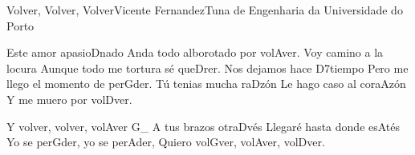 \begin{musica}{Volver, Volver, Volver}{Vicente Fernandez}{Tuna de Engenharia da Universidade do Porto}

Este amor apasio\ac{D}{na}do
Anda todo alborotado por vol\ac{A}{ver}.
Voy camino a la locura
Aunque todo me tortura sé que\ac{D}{rer}.
Nos dejamos hace \ac{D7}{tiem}po
Pero me llego el momento de per\ac{G}{der}.
Tú tenias mucha ra\ac{D}{zón}
Le hago caso al cora\ac{A}{zón}
Y me muero por vol\ac{D}{ver}.

Y volver, volver, vol\ac{A}{ver}
\ac{G}{}_ A tus brazos otra\ac{D}{vés}
Llegaré hasta donde es\ac{A}{tés}
Yo se per\ac{G}{der}, yo se per\ac{A}{der},
Quiero vol\ac{G}{ver}, vol\ac{A}{ver}, vol\ac{D}{ver}.

\end{musica}
